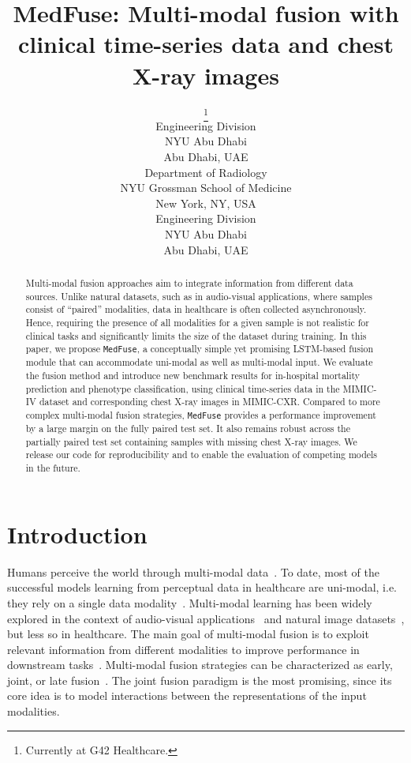 \documentclass[pmlr]{jmlr}
\title[Multi-modal fusion with clinical time-series data and chest X-ray images]{MedFuse: Multi-modal fusion with clinical time-series data and chest X-ray images}
\author{\Name{Nasir Hayat}\thanks{Currently at G42 Healthcare.}
      \Email{nasirhayat6160@gmail.com}\\ 
      \addr Engineering Division\\
      NYU Abu Dhabi\\
      Abu Dhabi, UAE 
      \AND
      \Name{Krzysztof J. Geras}
      \Email{k.j.geras@nyu.edu }\\ 
      \addr Department of Radiology\\
      NYU Grossman School of Medicine\\
      New York, NY, USA
      \AND
      \Name{Farah E. Shamout}
      \Email{farah.shamout@nyu.edu}\\ 
      \addr Engineering Division\\
      NYU Abu Dhabi\\
      Abu Dhabi, UAE}
\begin{document}
\maketitle

\begin{abstract}
 Multi-modal fusion approaches aim to integrate information from different data sources. Unlike natural datasets, such as in audio-visual applications, where samples consist of ``paired'' modalities, data in healthcare is often collected asynchronously. Hence, requiring the presence of all modalities for a given sample is not realistic for clinical tasks and significantly limits the size of the dataset during training. In this paper, we propose \texttt{MedFuse}, a conceptually simple yet promising LSTM-based fusion module that can accommodate uni-modal as well as multi-modal input. We evaluate the fusion method and introduce new benchmark results for in-hospital mortality prediction and phenotype classification, using clinical time-series data in the MIMIC-IV dataset and corresponding chest X-ray images in MIMIC-CXR. Compared to more complex multi-modal fusion strategies, \texttt{MedFuse} provides a performance improvement by a large margin on the fully paired test set. It also remains robust across the partially paired test set containing samples with missing chest X-ray images. We release our code for reproducibility and to enable the evaluation of competing models in the future. 
\end{abstract}


\section{Introduction}

Humans perceive the world through multi-modal data~\citep{ngiam2011multimodal}. To date, most of the successful models learning from perceptual data in healthcare are uni-modal, i.e. they rely on a single data modality~\citep{Huang2020_survey}. Multi-modal learning has been widely explored in the context of audio-visual applications~\citep{vaezi20mmtm} and natural image datasets~\citep{zellers2021merlot, zsd}, but less so in healthcare. The main goal of multi-modal fusion is to exploit relevant information from different modalities to improve performance in downstream tasks~\citep{baltruvsaitis2018multimodal}. Multi-modal fusion strategies can be characterized as early, joint, or late fusion~\citep{Huang2020_survey}. The joint fusion paradigm is the most promising, since its core idea is to model interactions between the representations of the input modalities.
\end{document}
